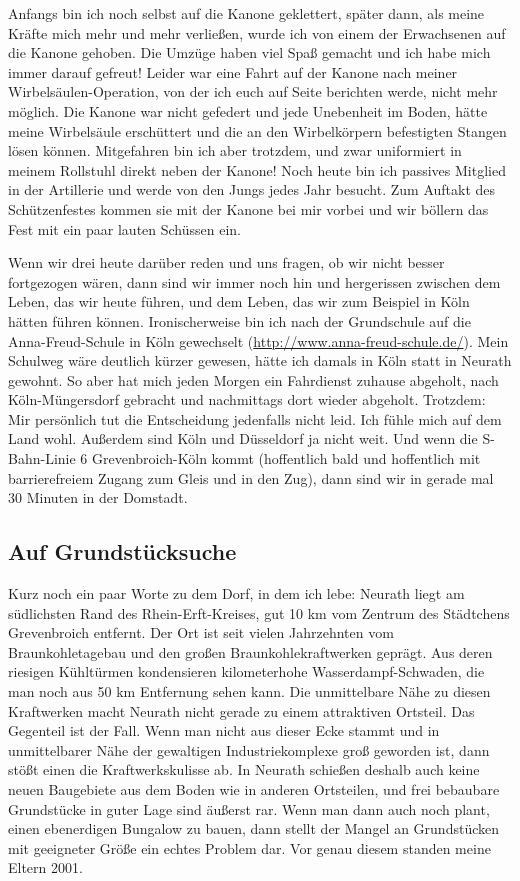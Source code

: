 \documentclass[fontsize=14pt,a4paper,headinclude,DIV=calc,automark]{scrbook}
\begin{document}
Anfangs bin ich noch selbst auf die Kanone geklettert, später dann, als meine Kräfte mich mehr und mehr verließen, wurde ich von einem der Erwachsenen auf die Kanone gehoben. Die Umzüge haben viel Spaß gemacht und ich habe mich immer darauf gefreut! Leider war eine Fahrt auf der Kanone nach meiner Wirbelsäulen-Operation, von der ich euch auf Seite \pageref{sec:wirbelsaeulenversteifung} berichten werde, nicht mehr möglich. Die Kanone war nicht gefedert und jede Unebenheit im Boden, hätte meine Wirbelsäule erschüttert und die an den Wirbelkörpern befestigten Stangen lösen können. Mitgefahren bin ich aber trotzdem, und zwar uniformiert in meinem Rollstuhl direkt neben der Kanone! Noch heute bin ich passives Mitglied in der Artillerie und werde von den Jungs jedes Jahr besucht. Zum Auftakt des Schützenfestes kommen sie mit der Kanone bei mir vorbei und wir böllern das Fest mit ein paar lauten Schüssen ein.

Wenn wir drei heute darüber reden und uns fragen, ob wir nicht besser fortgezogen wären, dann sind wir immer noch hin und hergerissen zwischen dem Leben, das wir heute führen, und dem Leben, das wir zum Beispiel in Köln hätten führen können. Ironischerweise bin ich nach der Grundschule auf die Anna-Freud-Schule in Köln gewechselt (\url{http://www.anna-freud-schule.de/}). Mein Schulweg wäre deutlich kürzer gewesen, hätte ich damals in Köln statt in Neurath gewohnt. So aber hat mich jeden Morgen ein Fahrdienst zuhause abgeholt, nach Köln-Müngersdorf gebracht und nachmittags dort wieder abgeholt. Trotzdem: Mir persönlich tut die Entscheidung jedenfalls nicht leid. Ich fühle mich auf dem Land wohl. Außerdem sind Köln und Düsseldorf ja nicht weit. Und wenn die S-Bahn-Linie 6 Grevenbroich-Köln kommt (hoffentlich bald und hoffentlich mit barrierefreiem Zugang zum Gleis und in den Zug), dann sind wir in gerade mal 30 Minuten in der Domstadt.

\subsection{Auf Grundstücksuche}

Kurz noch ein paar Worte zu dem Dorf, in dem ich lebe: Neurath liegt am südlichsten Rand des Rhein-Erft-Kreises, gut 10 km vom Zentrum des Städtchens Grevenbroich entfernt. Der Ort ist seit vielen Jahrzehnten vom Braunkohletagebau und den großen Braunkohlekraftwerken geprägt. Aus deren riesigen Kühltürmen kondensieren kilometerhohe Wasserdampf-Schwaden, die man noch aus 50 km Entfernung sehen kann. Die unmittelbare Nähe zu diesen Kraftwerken macht Neurath nicht gerade zu einem attraktiven Ortsteil. Das Gegenteil ist der Fall. Wenn man nicht aus dieser Ecke stammt und in unmittelbarer Nähe der gewaltigen Industriekomplexe groß geworden ist, dann stößt einen die Kraftwerkskulisse ab. In Neurath schießen deshalb auch keine neuen Baugebiete aus dem Boden wie in anderen Ortsteilen, und frei bebaubare Grundstücke in guter Lage sind äußerst rar. Wenn man dann auch noch plant, einen ebenerdigen Bungalow zu bauen, dann stellt der Mangel an Grundstücken mit geeigneter Größe ein echtes Problem dar. Vor genau diesem standen meine Eltern 2001.
\end{document}
